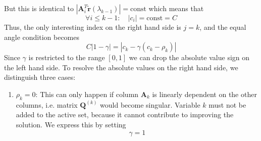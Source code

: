 But this is identical to $\left|\mathbf{A}_{i}^{T}\tilde{\mathbf{r}}\left(\lambda_{k-1}\right)\right|=\mbox{const}$
which means that
\begin{equation}
\forall i\le k-1:\quad\left|c_{i}\right|=\mathrm{const}=C
\end{equation}
Thus, the only interesting index on the right hand side is $j=k$,
and the equal angle condition becomes
\begin{equation}
C\left|1-\gamma\right|=\left|c_{k}-\gamma\left(c_{k}-\rho_{k}\right)\right|
\end{equation}
Since $\gamma$ is restricted to the range $\left[0,1\right]$ we
can drop the absolute value sign on the left hand side. To resolve
the absolute values on the right hand side, we distinguish three cases:
\begin{enumerate}
\item $\rho_{k}=0$: This can only happen if column $\mathbf{A}_{k}$ is
linearly dependent on the other columns, i.e. matrix $\mathbf{Q}^{(k)}$
would become singular. Variable $k$ must not be added to the active
set, because it cannot contribute to improving the solution. We express
this by setting
\begin{equation}
\gamma=1\label{eq:gamma-rho-is-zero}
\end{equation}


\end{enumerate}
